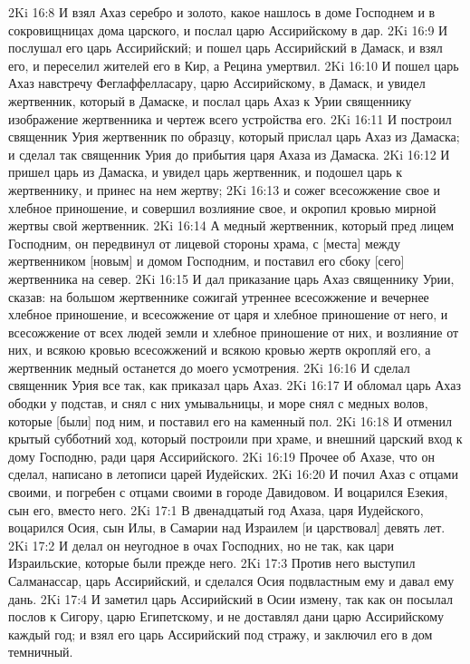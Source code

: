 2Ki 16:8  И взял Ахаз серебро и золото, какое нашлось в доме Господнем и в сокровищницах дома царского, и послал царю Ассирийскому в дар.
2Ki 16:9  И послушал его царь Ассирийский; и пошел царь Ассирийский в Дамаск, и взял его, и переселил жителей его в Кир, а Рецина умертвил.
2Ki 16:10  И пошел царь Ахаз навстречу Феглаффелласару, царю Ассирийскому, в Дамаск, и увидел жертвенник, который в Дамаске, и послал царь Ахаз к Урии священнику изображение жертвенника и чертеж всего устройства его.
2Ki 16:11  И построил священник Урия жертвенник по образцу, который прислал царь Ахаз из Дамаска; и сделал так священник Урия до прибытия царя Ахаза из Дамаска.
2Ki 16:12  И пришел царь из Дамаска, и увидел царь жертвенник, и подошел царь к жертвеннику, и принес на нем жертву;
2Ki 16:13  и сожег всесожжение свое и хлебное приношение, и совершил возлияние свое, и окропил кровью мирной жертвы свой жертвенник.
2Ki 16:14  А медный жертвенник, который пред лицем Господним, он передвинул от лицевой стороны храма, с [места] между жертвенником [новым] и домом Господним, и поставил его сбоку [сего] жертвенника на север.
2Ki 16:15  И дал приказание царь Ахаз священнику Урии, сказав: на большом жертвеннике сожигай утреннее всесожжение и вечернее хлебное приношение, и всесожжение от царя и хлебное приношение от него, и всесожжение от всех людей земли и хлебное приношение от них, и возлияние от них, и всякою кровью всесожжений и всякою кровью жертв окропляй его, а жертвенник медный останется до моего усмотрения.
2Ki 16:16  И сделал священник Урия все так, как приказал царь Ахаз.
2Ki 16:17  И обломал царь Ахаз ободки у подстав, и снял с них умывальницы, и море снял с медных волов, которые [были] под ним, и поставил его на каменный пол.
2Ki 16:18  И отменил крытый субботний ход, который построили при храме, и внешний царский вход к дому Господню, ради царя Ассирийского.
2Ki 16:19  Прочее об Ахазе, что он сделал, написано в летописи царей Иудейских.
2Ki 16:20  И почил Ахаз с отцами своими, и погребен с отцами своими в городе Давидовом. И воцарился Езекия, сын его, вместо него.
2Ki 17:1  В двенадцатый год Ахаза, царя Иудейского, воцарился Осия, сын Илы, в Самарии над Израилем [и царствовал] девять лет.
2Ki 17:2  И делал он неугодное в очах Господних, но не так, как цари Израильские, которые были прежде него.
2Ki 17:3  Против него выступил Салманассар, царь Ассирийский, и сделался Осия подвластным ему и давал ему дань.
2Ki 17:4  И заметил царь Ассирийский в Осии измену, так как он посылал послов к Сигору, царю Египетскому, и не доставлял дани царю Ассирийскому каждый год; и взял его царь Ассирийский под стражу, и заключил его в дом темничный.
